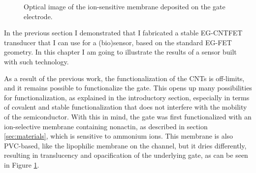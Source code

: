 \begin{figure}[b]
    \centering
    \caption{Optical image of the ion-sensitive membrane deposited on the gate electrode.}
    \label{fig:ammoniumMembrane}
\end{figure}

In the previous section I demonstrated that I fabricated a stable EG-CNTFET transducer that I can use for a (bio)sensor, based on the standard EG-FET geometry. In this chapter I am going to illustrate the results of a sensor built with such technology.

As a result of the previous work, the functionalization of the CNTs is off-limits, and it remains possible to functionalize the gate. This opens up many possibilities for functionalization, as explained in the introductory section, especially in terms of covalent and stable functionalization that does not interfere with the mobility of the semiconductor. With this in mind, the gate was first functionalized with an ion-selective membrane containing nonactin, as described in section \ref{sec:materials}, which is sensitive to ammonium ions. This membrane is also PVC-based, like the lipophilic membrane on the channel, but it dries differently, resulting in translucency and opacification of the underlying gate, as can be seen in Figure \ref{fig:ammoniumMembrane}.

